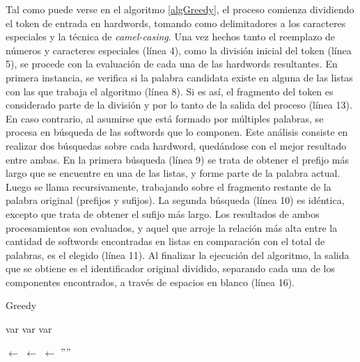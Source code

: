 Tal como puede verse en el algoritmo \ref{algGreedy}, el proceso comienza dividiendo el token de entrada en hardwords, tomando como delimitadores a los caracteres especiales y la técnica de \textit{camel-casing}.
Una vez hechos tanto el reemplazo de números y caracteres especiales (línea 4), como la división inicial del token (línea 5), se procede con la evaluación de cada una de las hardwords resultantes.
En primera instancia, se verifica si la palabra candidata existe en alguna de las listas con las que trabaja el algoritmo (línea 8).
Si es así, el fragmento del token es considerado parte de la división y por lo tanto de la salida del proceso (línea 13).
En caso contrario, al asumirse que está formado por múltiples palabras, se procesa en búsqueda de las softwords que lo componen.
Este análisis consiste en realizar dos búsquedas sobre cada hardword, quedándose con el mejor resultado entre ambas.
En la primera búsqueda (línea 9) se trata de obtener el prefijo más largo que se encuentre en una de las listas, y forme parte de la palabra actual.
Luego se llama recursivamente, trabajando sobre el fragmento restante de la palabra original (prefijos y sufijos).
La segunda búsqueda (línea 10) es idéntica, excepto que trata de obtener el sufijo más largo.
Los resultados de ambos procesamientos son evaluados, y aquel que arroje la relación más alta entre la cantidad de softwords encontradas en listas en comparación con el total de palabras, es el elegido (línea 11).
Al finalizar la ejecución del algoritmo, la salida que se obtiene es el identificador original dividido, separando cada una de los componentes encontrados, a través de espacios en blanco (línea 16).

\begin{algorithm}[H]
\caption{Greedy}
\label{algGreedy}
\DontPrintSemicolon
  
  
  
  \BlankLine
  var \Dictionary\;
  var \KnownAbbrs\;
  var \StopList\;
  
  \BlankLine
  \Token $\leftarrow$ \SplitChars\;
  \Token $\leftarrow$ \SplitLowerUpperCase\;
  \SplitToken $\leftarrow$ $""$\;
  
  \BlankLine
  \BlankLine
  \KwRet \SplitToken\;
\end{algorithm}


